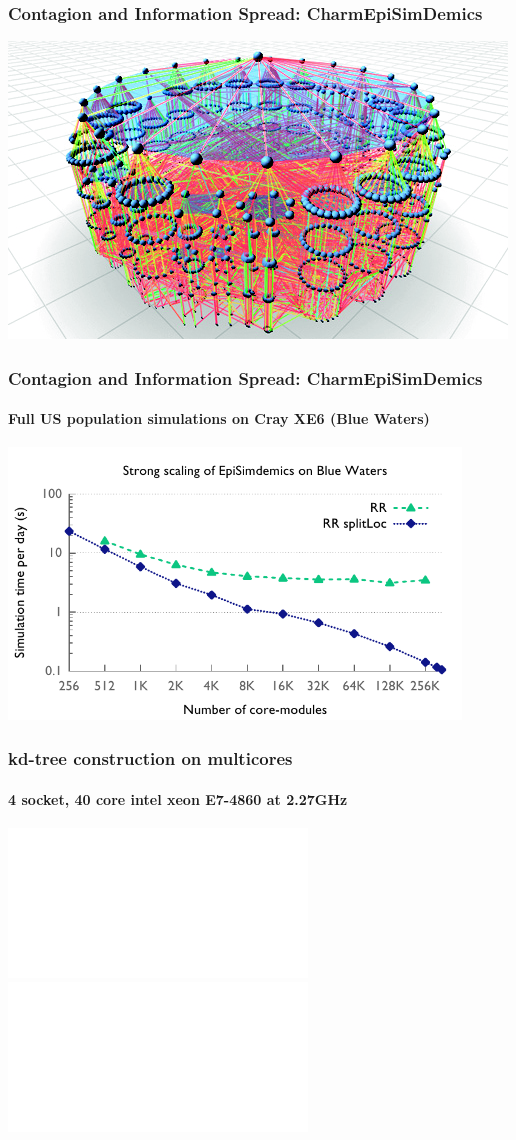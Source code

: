 \begin{frame}
\frametitle{Contagion and Information Spread: CharmEpiSimDemics}
\includegraphics[width=\textwidth]{../figures/contagion.png}
\end{frame}


\begin{frame}
\frametitle{Contagion and Information Spread: CharmEpiSimDemics}
\framesubtitle{Full US population simulations on Cray XE6 (Blue Waters)}
\begin{center}
\includegraphics[width=0.9\textwidth]{../figures/simdemics_strong_scaling.pdf}
\end{center}
\end{frame}


\begin{frame}
\frametitle{kd-tree construction on multicores}
\framesubtitle{4 socket, 40 core intel xeon E7-4860 at 2.27GHz}
\includegraphics<1>[height=0.8\textheight]{../figures/kdtree/speedup_8.pdf}
\includegraphics<2>[height=0.8\textheight]{../figures/kdtree/speedup_15.pdf}
\end{frame}


